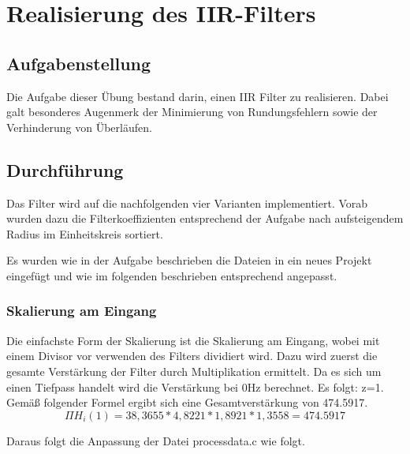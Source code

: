 \chapter{Realisierung des IIR-Filters}\label{Cha:RealIIR}
\section{Aufgabenstellung}
Die Aufgabe dieser Übung bestand darin, einen IIR Filter zu realisieren. Dabei galt besonderes Augenmerk der Minimierung von Rundungsfehlern sowie der Verhinderung von Überläufen.
\section{Durchf\"uhrung}
Das Filter wird auf die nachfolgenden vier Varianten implementiert. Vorab wurden dazu die Filterkoeffizienten entsprechend der Aufgabe nach aufsteigendem Radius im Einheitskreis sortiert.

Es wurden wie in der Aufgabe beschrieben die Dateien in ein neues Projekt eingefügt und wie im folgenden beschrieben entsprechend angepasst.
\subsection{Skalierung am Eingang}
Die einfachste Form der Skalierung ist die Skalierung am Eingang, wobei mit einem Divisor vor verwenden des Filters dividiert wird. Dazu wird zuerst die gesamte Verstärkung der Filter durch Multiplikation ermittelt.
Da es sich um einen Tiefpass handelt wird die Verstärkung bei 0Hz berechnet. Es folgt: z=1.
Gemäß folgender Formel ergibt sich eine Gesamtverstärkung von 474.5917.
\begin{equation}
\Pi H_i(1)=38,3655*4,8221*1,8921*1,3558=474.5917
\end{equation}

Daraus folgt die Anpassung der Datei process\textunderscore data.c wie folgt.\\


